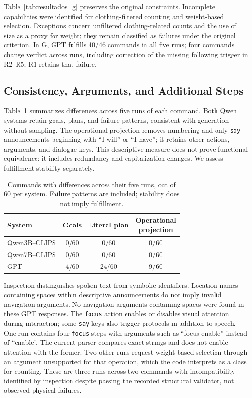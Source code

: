 \documentclass[a4paper,twoside]{article}
\begin{document}
Table~\ref{tab:resultados_g} preserves the original constraints. Incomplete capabilities were identified for clothing-filtered counting and weight-based selection. Exceptions concern unfiltered clothing-related counts and the use of size as a proxy for weight; they remain classified as failures under the original criterion. In G, GPT fulfills 40/46 commands in all five runs; four commands change verdict across runs, including correction of the missing following trigger in R2--R5; R1 retains that failure.

\subsection{Consistency, Arguments, and Additional Steps}
Table~\ref{tab:consistencia} summarizes differences across five runs of each command. Both Qwen systems retain goals, plans, and failure patterns, consistent with generation without sampling. The operational projection removes numbering and only \texttt{say} announcements beginning with ``I will'' or ``I have''; it retains other actions, arguments, and dialogue keys. This descriptive measure does not prove functional equivalence: it includes redundancy and capitalization changes. We assess fulfillment stability separately.

\begin{table}[htbp]
\centering\small
\caption{Commands with differences across their five runs, out of 60 per system. Failure patterns are included; stability does not imply fulfillment.}
\label{tab:consistencia}
\begin{tabularx}{\columnwidth}{@{}lccc@{}}
\toprule
System & Goals & Literal plan & \shortstack{Operational\\projection} \\
\midrule
Qwen3B--CLIPS & 0/60 & 0/60 & 0/60 \\
Qwen7B--CLIPS & 0/60 & 0/60 & 0/60 \\
GPT & 4/60 & 24/60 & 9/60 \\
\bottomrule
\end{tabularx}
\end{table}


Inspection distinguishes spoken text from symbolic identifiers. Location names containing spaces within descriptive announcements do not imply invalid navigation arguments. No navigation arguments containing spaces were found in these GPT responses. The \texttt{focus} action enables or disables visual attention during interaction; some \texttt{say} keys also trigger protocols in addition to speech. One run contains four \texttt{focus} steps with arguments such as ``focus enable'' instead of ``enable''. The current parser compares exact strings and does not enable attention with the former. Two other runs request weight-based selection through an argument unsupported for that operation, which the code interprets as a class for counting. These are three runs across two commands with incompatibility identified by inspection despite passing the recorded structural validator, not observed physical failures.
\end{document}
